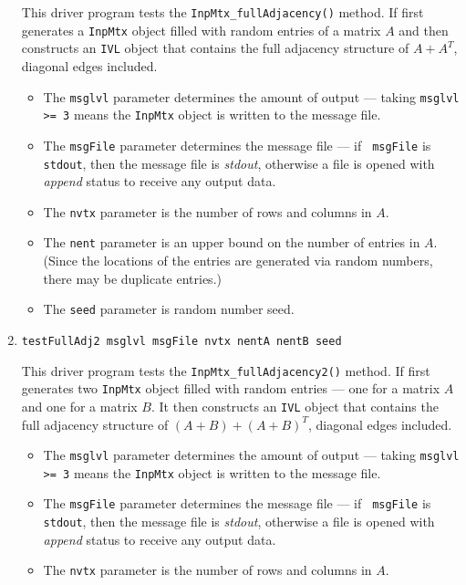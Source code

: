 \begin{enumerate}
\begin{verbatim}
\end{verbatim}
This driver program tests the {\tt InpMtx\_fullAdjacency()} method.
If first generates a {\tt InpMtx} object filled with
random entries of a matrix $A$ and then constructs an {\tt IVL}
object that contains the full adjacency structure of $A + A^T$,
diagonal edges included.
\par
\begin{itemize}
\item
The {\tt msglvl} parameter determines the amount of output ---
taking {\tt msglvl >= 3} means the {\tt InpMtx} object is written
to the message file.
\item
The {\tt msgFile} parameter determines the message file --- if {\tt
msgFile} is {\tt stdout}, then the message file is {\it stdout},
otherwise a file is opened with {\it append} status to receive any
output data.
\item
The {\tt nvtx} parameter is the number of rows and columns in $A$.
\item
The {\tt nent} parameter is an upper bound on the number of entries
in $A$. (Since the locations of the entries are generated via
random numbers, there may be duplicate entries.) 
\item
The {\tt seed} parameter is random number seed.
\end{itemize}
\item
\begin{verbatim}
testFullAdj2 msglvl msgFile nvtx nentA nentB seed
\end{verbatim}
This driver program tests the {\tt InpMtx\_fullAdjacency2()} method.
If first generates two {\tt InpMtx} object filled with
random entries --- one for a matrix $A$ and one for a matrix $B$.
It then constructs an {\tt IVL}
object that contains the full adjacency structure of $(A+B) + (A+B)^T$,
diagonal edges included.
\par
\begin{itemize}
\item
The {\tt msglvl} parameter determines the amount of output ---
taking {\tt msglvl >= 3} means the {\tt InpMtx} object is written
to the message file.
\item
The {\tt msgFile} parameter determines the message file --- if {\tt
msgFile} is {\tt stdout}, then the message file is {\it stdout},
otherwise a file is opened with {\it append} status to receive any
output data.
\item
The {\tt nvtx} parameter is the number of rows and columns in $A$.

\end{itemize}
\end{enumerate}
